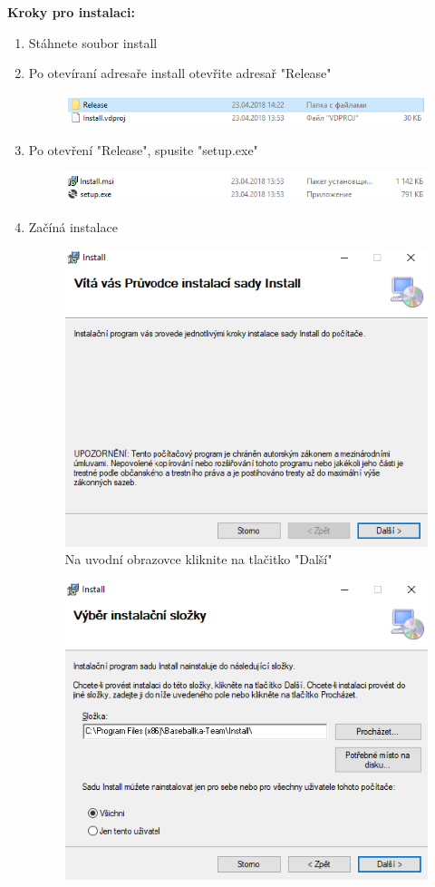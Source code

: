 \documentclass[12pt,a4paper]{article}
\begin{document}
	
	\textbf{Kroky pro instalaci:}
	\begin{enumerate}
	\item Stáhnete soubor install
	\item Po otevíraní adresaře install otevřite adresař "Release"
	\begin{figure}[H]
		\center\includegraphics[width=0.8\linewidth]{pictures/2} 
	\end{figure}
	\item Po otevření "Release", spusite "setup.exe"
	\begin{figure}[H]
		\center\includegraphics[width=0.8\linewidth]{pictures/3} 
	\end{figure}
	\item Začíná instalace
	\begin{figure}[H]
		\center\includegraphics[width=0.8\linewidth]{pictures/4}
		\caption{Na uvodní obrazovce kliknite na tlačitko "Další"} 
	\end{figure}
	\begin{figure}[H]
		\center\includegraphics[width=0.8\linewidth]{pictures/5}

\end{figure}
\end{enumerate}
\end{document}
